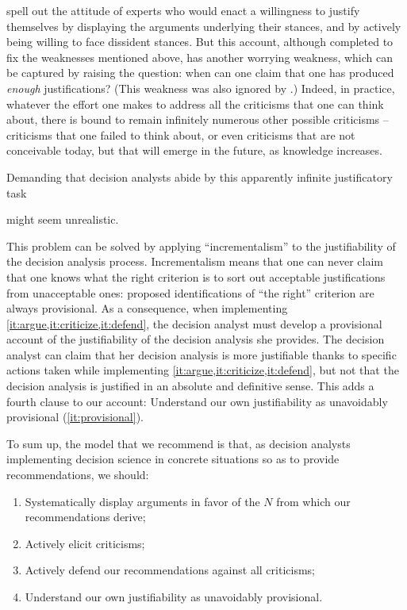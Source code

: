 \documentclass[preprint, french, english, 11pt, authoryear]{elsarticle}%
\begin{document}
 spell out the attitude of experts who would enact a willingness to justify themselves by displaying the arguments underlying their stances, and by actively being willing to face dissident stances. 
But this account, although completed to fix the weaknesses mentioned above, has another worrying weakness, which can be captured by raising the question: when can one claim that one has produced \emph{enough} justifications? (This weakness was also ignored by  \citet{meinard_what_2017}.) 
Indeed, in practice, whatever the effort one makes to address all the criticisms that one can think about, there is bound to remain infinitely numerous other possible criticisms -- criticisms that one failed to think about, or even criticisms that are not conceivable today, but that will emerge in the future, as knowledge increases. 
\begin{changebar}Demanding that decision analysts abide by this apparently infinite justificatory task\end{changebar} might seem unrealistic.

This problem can be solved by applying ``incrementalism'' to the justifiability of the decision analysis process. 
Incrementalism means that one can never claim that one knows what the right criterion is to sort out acceptable justifications from unacceptable ones: proposed identifications of ``the right'' criterion are always provisional. 
As a consequence, when implementing \cref{it:argue,it:criticize,it:defend}, the decision analyst must develop a provisional account of the justifiability of the decision analysis she provides. 
The decision analyst can claim that her decision analysis is more justifiable thanks to specific actions taken while implementing \cref{it:argue,it:criticize,it:defend}, but not that the decision analysis is justified in an absolute and definitive sense. 
This adds a fourth clause to our account: Understand our own justifiability as unavoidably provisional (\ref{it:provisional}).

To sum up, the model that we recommend is that, as decision analysts implementing decision science in concrete situations so as to provide recommendations, we should:
\begin{enumerate}[label=\emph{\roman*}., ref=\textit{\roman*}]
\setlength{\itemsep}{0pt}
\setlength{\parskip}{0pt}
	\item \label{it:argue}Systematically display arguments in favor of the $N$ from which our recommendations derive;
	\item \label{it:criticize}Actively elicit criticisms;
	\item \label{it:defend}Actively defend our recommendations against all criticisms;
	\item \label{it:provisional}Understand our own justifiability as unavoidably provisional.
\end{enumerate}
\end{document}
